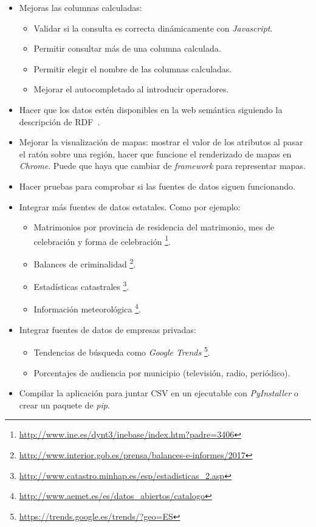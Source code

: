 \begin{itemize}
	\item Mejoras las columnas calculadas:
	\begin{itemize}
		\item Validar si la consulta es correcta dinámicamente con \textit{Javascript}.
		\item Permitir consultar más de una columna calculada.
		\item Permitir elegir el nombre de las columnas calculadas.
		\item Mejorar el autocompletado al introducir operadores.
	\end{itemize}
	\item Hacer que los datos estén disponibles en la web semántica siguiendo la descripción de RDF~\cite{misc:informationserviceengineering}.
	\item Mejorar la visualización de mapas: mostrar el valor de los atributos al pasar el ratón sobre una región, hacer que funcione el renderizado de mapas en \textit{Chrome}. Puede que haya que cambiar de \textit{framework} para representar mapas. 
	\item Hacer pruebas para comprobar si las fuentes de datos siguen funcionando.
	\item Integrar más fuentes de datos estatales. Como por ejemplo:
	\begin{itemize}
		\item Matrimonios por provincia de residencia del matrimonio, mes de celebración y forma de celebración
		\footnote{\href{http://www.ine.es/dynt3/inebase/index.htm?padre=3406}{http://www.ine.es/dynt3/inebase/index.htm?padre=3406}}.
		\item Balances de criminalidad
		\footnote{\href{http://www.interior.gob.es/prensa/balances-e-informes/2017}{http://www.interior.gob.es/prensa/balances-e-informes/2017}}.
		\item Estadísticas catastrales
		\footnote{\href{http://www.catastro.minhap.es/esp/estadisticas\_2.asp}{http://www.catastro.minhap.es/esp/estadisticas\_2.asp}}.
		\item Información meteorológica
		\footnote{\href{http://www.aemet.es/es/datos\_abiertos/catalogo}{http://www.aemet.es/es/datos\_abiertos/catalogo}}.
	\end{itemize}
	\item Integrar fuentes de datos de empresas privadas:
	\begin{itemize}
		\item Tendencias de búsqueda como \textit{Google Trends}
		\footnote{\href{https://trends.google.es/trends/?geo=ES}{https://trends.google.es/trends/?geo=ES}}.
		\item Porcentajes de audiencia por municipio (televisión, radio, periódico).
	\end{itemize}
	\item Compilar la aplicación para juntar CSV en un ejecutable con \textit{PyInstaller} o crear un paquete de \textit{pip}. 
\end{itemize}